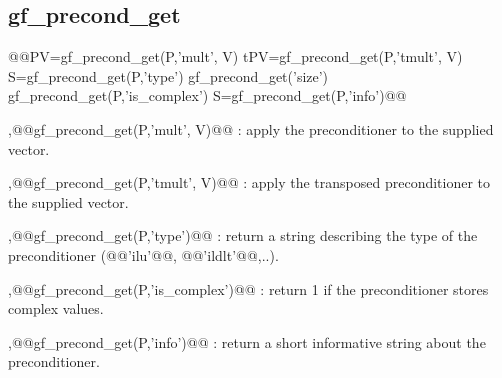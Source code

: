 \subsection{gf\_precond_get}
\begin{synopsis}
@@\tvec PV=gf_precond_get(P,'mult', \tvec V)
\tvec tPV=gf_precond_get(P,'tmult', \tvec V)
\tstr S=gf_precond_get(P,'type')
\tivec gf_precond_get('size')
\tint gf_precond_get(P,'is_complex')
\tstr S=gf_precond_get(P,'info')@@\end{synopsis}
\begin{cmddescription}
  \sep{@@gf_precond_get(P,'mult', V)@@} : apply the preconditioner to the supplied vector.

  \sep{@@gf_precond_get(P,'tmult', V)@@} : apply the transposed preconditioner to the supplied vector.

  \sep{@@gf_precond_get(P,'type')@@} : return a string describing the type of the preconditioner (@@'ilu'@@, @@'ildlt'@@,..).

  \sep{@@gf_precond_get(P,'is_complex')@@} : return 1 if the preconditioner stores complex values.

  \sep{@@gf_precond_get(P,'info')@@} : return a short informative string about the preconditioner.
\end{cmddescription}
\newpage


